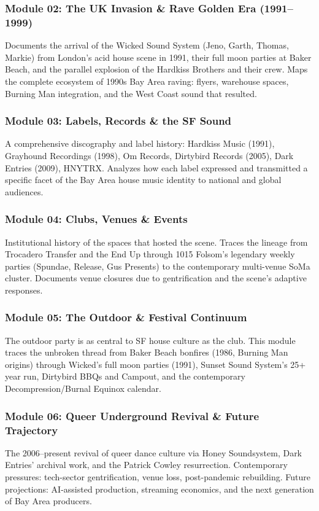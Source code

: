 \documentclass[11pt,letterpaper]{article}
\begin{document}
\subsubsection{Module 02: The UK Invasion \& Rave Golden Era (1991--1999)}
Documents the arrival of the Wicked Sound System (Jeno, Garth, Thomas, Markie) from London's acid house scene in 1991, their full moon parties at Baker Beach, and the parallel explosion of the Hardkiss Brothers and their crew. Maps the complete ecosystem of 1990s Bay Area raving: flyers, warehouse spaces, Burning Man integration, and the West Coast sound that resulted.

\subsubsection{Module 03: Labels, Records \& the SF Sound}
A comprehensive discography and label history: Hardkiss Music (1991), Grayhound Recordings (1998), Om Records, Dirtybird Records (2005), Dark Entries (2009), HNYTRX. Analyzes how each label expressed and transmitted a specific facet of the Bay Area house music identity to national and global audiences.

\subsubsection{Module 04: Clubs, Venues \& Events}
Institutional history of the spaces that hosted the scene. Traces the lineage from Trocadero Transfer and the End Up through 1015 Folsom's legendary weekly parties (Spundae, Release, Gus Presents) to the contemporary multi-venue SoMa cluster. Documents venue closures due to gentrification and the scene's adaptive responses.

\subsubsection{Module 05: The Outdoor \& Festival Continuum}
The outdoor party is as central to SF house culture as the club. This module traces the unbroken thread from Baker Beach bonfires (1986, Burning Man origins) through Wicked's full moon parties (1991), Sunset Sound System's 25+ year run, Dirtybird BBQs and Campout, and the contemporary Decompression/Burnal Equinox calendar.

\subsubsection{Module 06: Queer Underground Revival \& Future Trajectory}
The 2006--present revival of queer dance culture via Honey Soundsystem, Dark Entries' archival work, and the Patrick Cowley resurrection. Contemporary pressures: tech-sector gentrification, venue loss, post-pandemic rebuilding. Future projections: AI-assisted production, streaming economics, and the next generation of Bay Area producers.
\end{document}
